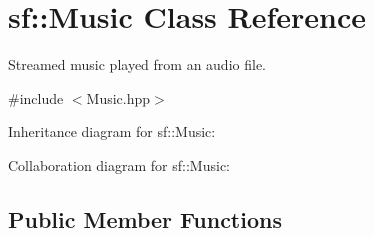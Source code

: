 \hypertarget{classsf_1_1_music}{}\section{sf\+:\+:Music Class Reference}
\label{classsf_1_1_music}


Streamed music played from an audio file.  




{\ttfamily \#include $<$Music.\+hpp$>$}



Inheritance diagram for sf\+:\+:Music\+:


Collaboration diagram for sf\+:\+:Music\+:
\subsection*{Public Member Functions}
